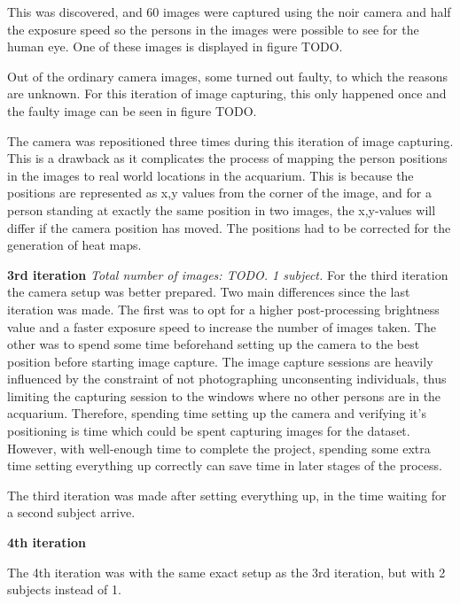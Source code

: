This was discovered, and 60 images were captured using the noir camera and half the exposure speed so the persons in the images were possible to see for the human eye. One of these images is displayed in figure TODO.

Out of the ordinary camera images, some turned out faulty, to which the reasons are unknown. For this iteration of image capturing, this only happened once and the faulty image can be seen in figure TODO.

The camera was repositioned three times during this iteration of image capturing. This is a drawback as it complicates the process of mapping the person positions in the images to real world locations in the acquarium. This is because the positions are represented as x,y values from the corner of the image, and for a person standing at exactly the same position in two images, the x,y-values will differ if the camera position has moved. The positions had to be corrected for the generation of heat maps. 




\textbf{3rd iteration}
\textit{Total number of images: TODO. 1 subject.}
For the third iteration the camera setup was better prepared. Two main differences since the last iteration was made. The first was to opt for a higher post-processing brightness value and a faster exposure speed to increase the number of images taken. The other was to spend some time beforehand setting up the camera to the best position before starting image capture. The image capture sessions are heavily influenced by the constraint of not photographing unconsenting individuals, thus limiting the capturing session to the windows where no other persons are in the acquarium. Therefore, spending time setting up the camera and verifying it's positioning is time which could be spent capturing images for the dataset. However, with well-enough time to complete the project, spending some extra time setting everything up correctly can save time in later stages of the process. 

The third iteration was made after setting everything up, in the time waiting for a second subject arrive.

\textbf{4th iteration}

The 4th iteration was with the same exact setup as the 3rd iteration, but with 2 subjects instead of 1.  

